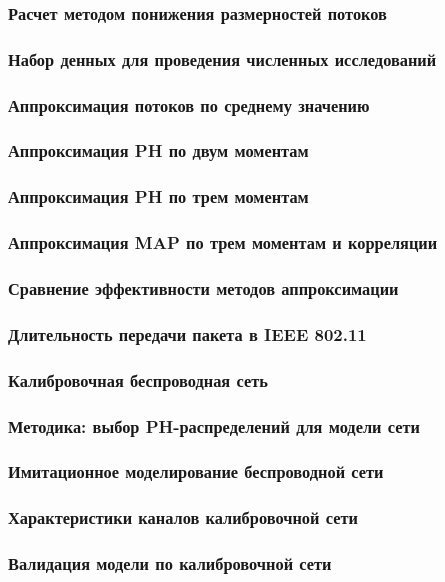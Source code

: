 \begin{frame}
    \frametitle{Расчет методом понижения размерностей потоков}
\end{frame}

\begin{frame}
    \frametitle{Набор денных для проведения численных исследований}
\end{frame}

\begin{frame}
    \frametitle{Аппроксимация потоков по среднему значению}
\end{frame}

\begin{frame}
    \frametitle{Аппроксимация PH по двум моментам}
\end{frame}

\begin{frame}
    \frametitle{Аппроксимация PH по трем моментам}
\end{frame}

\begin{frame}
    \frametitle{Аппроксимация MAP по трем моментам и корреляции}
\end{frame}

\begin{frame}
    \frametitle{Сравнение эффективности методов аппроксимации}
\end{frame}

\begin{frame}
    \frametitle{Длительность передачи пакета в IEEE 802.11}
\end{frame}

\begin{frame}
    \frametitle{Калибровочная беспроводная сеть}
\end{frame}

\begin{frame}
    \frametitle{Методика: выбор PH-распределений для модели сети}
\end{frame}

\begin{frame}
    \frametitle{Имитационное моделирование беспроводной сети}
\end{frame}

\begin{frame}
    \frametitle{Характеристики каналов калибровочной сети}
\end{frame}

\begin{frame}
    \frametitle{Валидация модели по калибровочной сети}
\end{frame}

